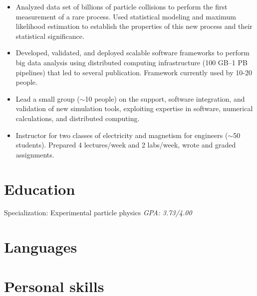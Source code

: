 \documentclass[9pt,a4paper]{moderncv}
\begin{document}
{
\begin{itemize}
    \item Analyzed data set of billions of particle collisions to perform the first measurement of a rare process. Used statistical modeling and maximum likelihood estimation to establish the properties of this new process and their statistical significance.
    \item Developed, validated, and deployed scalable software frameworks to perform big data analysis using
distributed computing infrastructure (100 GB--1 PB pipelines) that led to several publication. Framework currently used by 10-20 people.
    \item Lead a small group ($\sim$10 people) on the support, software integration, and validation of new simulation tools, exploiting expertise in software, numerical calculations, and distributed computing.
    \item Instructor for two classes of electricity and magnetism for engineers ($\sim$50 students). Prepared 4 lectures/week and 2 labs/week, wrote and graded assignments.
\end{itemize}
}
\section{Education}
{
    Specialization: Experimental particle physics\newline 
    \normalsize \textit{GPA: 3.73/4.00} 
}

\section{Languages}

\section{Personal skills}
\end{document}
